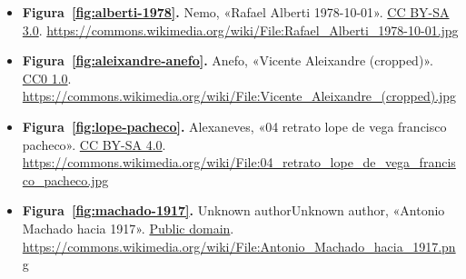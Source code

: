 \documentclass{book}
\begin{document}
\begin{itemize}
\item \textbf{Figura~\ref{fig:alberti-1978}.} Nemo, «Rafael Alberti 1978-10-01». \href{https://creativecommons.org/licenses/by-sa/3.0/}{CC BY-SA 3.0}. \url{https://commons.wikimedia.org/wiki/File:Rafael_Alberti_1978-10-01.jpg}
\item \textbf{Figura~\ref{fig:aleixandre-anefo}.} Anefo, «Vicente Aleixandre (cropped)». \href{https://creativecommons.org/publicdomain/zero/1.0/}{CC0 1.0}. \url{https://commons.wikimedia.org/wiki/File:Vicente_Aleixandre_(cropped).jpg}
\item \textbf{Figura~\ref{fig:lope-pacheco}.} Alexaneves, «04 retrato lope de vega francisco pacheco». \href{https://creativecommons.org/licenses/by-sa/4.0/}{CC BY-SA 4.0}. \url{https://commons.wikimedia.org/wiki/File:04_retrato_lope_de_vega_francisco_pacheco.jpg}
\item \textbf{Figura~\ref{fig:machado-1917}.} Unknown authorUnknown author, «Antonio Machado hacia 1917». \href{https://creativecommons.org/publicdomain/mark/1.0/}{Public domain}. \url{https://commons.wikimedia.org/wiki/File:Antonio_Machado_hacia_1917.png}
\end{itemize}
\backmatter
\end{document}
